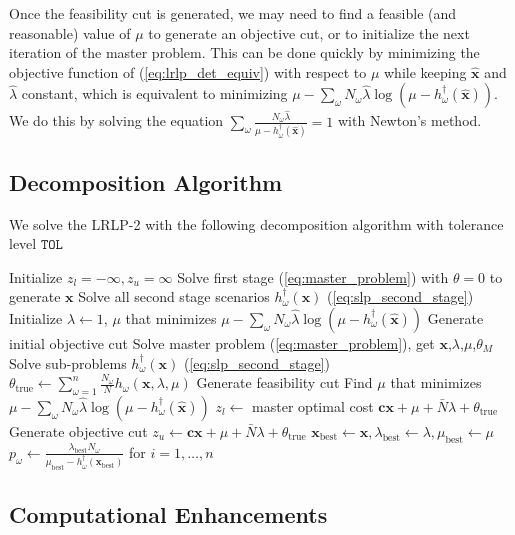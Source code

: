 \documentclass[11pt]{article}
\newcommand{\x}{\mathbf{x}}
\newcommand{\xh}{\hat{\x}}
\newcommand{\lh}{\hat{\lambda}}
\renewcommand{\c}{\mathbf{c}}
\begin{document}
Once the feasibility cut is generated, we may need to find a feasible (and reasonable) value of $\mu$ to generate an objective cut, or to initialize the next iteration of the master problem.
This can be done quickly by minimizing the objective function of (\ref{eq:lrlp_det_equiv}) with respect to $\mu$ while keeping $\xh$ and $\lh$ constant, which is equivalent to minimizing $\mu - \sum_\omega N_\omega \lh \log(\mu - h^\dagger_\omega(\xh))$.
We do this by solving the equation $\sum_\omega \frac{N_\omega \lh}{\mu - h^\dagger_\omega(\xh)} = 1$ with Newton's method.

\subsection{Decomposition Algorithm}

We solve the LRLP-2 with the following decomposition algorithm with tolerance level $\texttt{TOL}$

\begin{algorithmic}
	\State Initialize $z_l = -\infty, z_u = \infty$
	\State Solve first stage (\ref{eq:master_problem}) with $\theta = 0$  to generate $\x$
	\State Solve all second stage scenarios $h^\dagger_\omega(\x)$ (\ref{eq:slp_second_stage})
	\State Initialize $\lambda \gets 1$, $\mu$ that minimizes $\mu - \sum_\omega N_\omega \lh \log(\mu - h^\dagger_\omega(\xh))$
	\State Generate initial objective cut
		\State Solve master problem (\ref{eq:master_problem}), get $\x$,$\lambda$,$\mu$,$\theta_M$
		\State Solve sub-problems $h^\dagger_\omega(\x)$ (\ref{eq:slp_second_stage})
		\State $\theta_{\text{true}} \gets \sum_{\omega=1}^n \frac{N_\omega}{N} h_\omega(\x,\lambda,\mu)$
		\If{$\mu < \max_\omega h^\dagger_\omega(\x)$}
			\State Generate feasibility cut
			\State Find $\mu$ that minimizes $\mu - \sum_\omega N_\omega \lh \log(\mu - h^\dagger_\omega(\xh))$
		\Else
			\State $z_l \gets$ master optimal cost $\c\x + \mu + \bar{N}\lambda + \theta_{\text{true}}$
		\EndIf
		\State Generate objective cut
		\If{$\c\x + \mu + \bar{N}\lambda + \theta_{\text{true}} < z_u$}
			\State $z_u \gets \c\x + \mu + \bar{N}\lambda + \theta_{\text{true}}$
			\State $\x_\text{best} \gets \x, \lambda_\text{best} \gets \lambda, \mu_\text{best} \gets \mu$
			\State $p_\omega \gets \frac{\lambda_\text{best} N_\omega}{\mu_\text{best} - h^\dagger_\omega(\x_\text{best})}$ for $i = 1, \dots, n$
		\EndIf
	\EndWhile
\end{algorithmic}

\subsection{Computational Enhancements}
\end{document}
